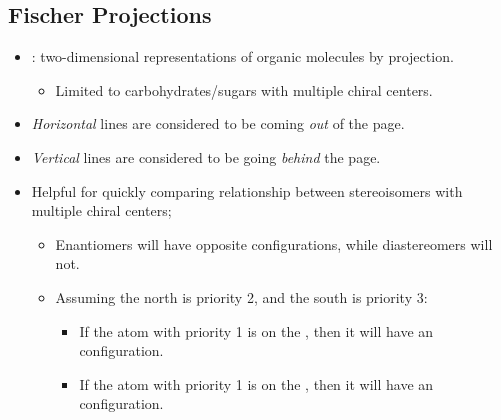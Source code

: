 \documentclass{inVerba-notes}
\begin{document}
\begin{itemize}
    \subsection{Fischer Projections}
    \begin{itemize}
        \item {}: two-dimensional representations of organic molecules by projection.
            \begin{itemize}
                \item Limited to carbohydrates/sugars with multiple chiral centers.
            \end{itemize}
        \item \emph{Horizontal} lines are considered to be coming \emph{out} of the page.
        \item \emph{Vertical} lines are considered to be going \emph{behind} the page.
        \item Helpful for quickly comparing relationship between stereoisomers with multiple chiral centers;
            \begin{itemize}
                \item Enantiomers will have opposite configurations, while diastereomers will not.
                \item Assuming the north is priority 2, and the south is priority 3:
                    \begin{itemize}
                        \item If the atom with priority 1 is on the , then it will have an  configuration.
                        \item If the atom with priority 1 is on the , then it will have an  configuration.
                    \end{itemize}
            \end{itemize}
    \end{itemize}
\end{itemize}


\end{document}
